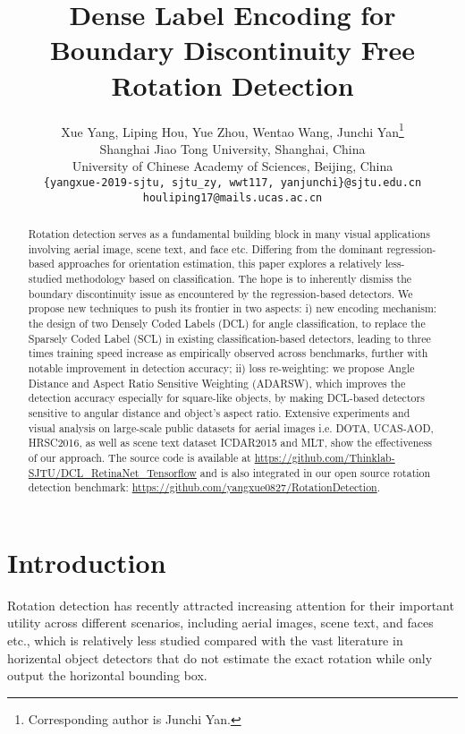 \documentclass[final]{cvpr}
\begin{document}
\title{Dense Label Encoding for Boundary Discontinuity Free Rotation Detection}

\author{Xue Yang, Liping Hou, Yue Zhou, Wentao Wang, Junchi Yan\thanks{Corresponding author is Junchi Yan.}\\
Shanghai Jiao Tong University, Shanghai, China\\
University of Chinese Academy of Sciences, Beijing, China\\
{\tt\small \{yangxue-2019-sjtu, sjtu\_zy, wwt117, yanjunchi\}@sjtu.edu.cn} \\
{\tt\small houliping17@mails.ucas.ac.cn}
}

\maketitle


\begin{abstract}
   Rotation detection serves as a fundamental building block in many visual applications involving aerial image, scene text, and face etc. Differing from the dominant regression-based approaches for orientation estimation, this paper explores a relatively less-studied methodology based on classification. The hope is to inherently dismiss the boundary discontinuity issue as encountered by the regression-based detectors. We propose new techniques to push its frontier in two aspects: i) new encoding mechanism: the design of two Densely Coded Labels (DCL) for angle classification, to replace the Sparsely Coded Label (SCL) in existing classification-based detectors, leading to three times training speed increase as empirically observed across benchmarks, further with notable improvement in detection accuracy; ii) loss re-weighting: we propose Angle Distance and Aspect Ratio Sensitive Weighting (ADARSW), which improves the detection accuracy especially for square-like objects, by making DCL-based detectors sensitive to angular distance and object's aspect ratio. Extensive experiments and visual analysis on large-scale public datasets for aerial images i.e. DOTA, UCAS-AOD, HRSC2016, as well as scene text dataset ICDAR2015 and MLT, show the effectiveness of our approach. The source code is available at \url{https://github.com/Thinklab-SJTU/DCL_RetinaNet_Tensorflow} and is also integrated in our open source rotation detection benchmark: \url{https://github.com/yangxue0827/RotationDetection}.
\end{abstract}

\section{Introduction}
Rotation detection has recently attracted increasing attention for their important utility across different scenarios, including aerial images, scene text, and faces etc., which is relatively less studied compared with the vast literature in horizental object detectors that do not estimate the exact rotation while only output the horizontal bounding box.
\end{document}
